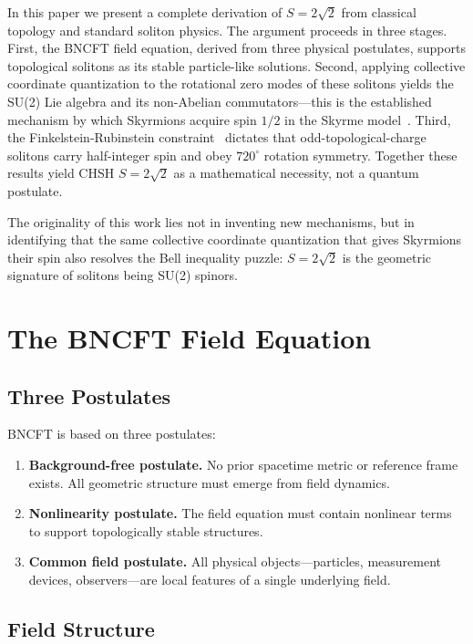 ﻿\documentclass[11pt,a4paper]{article}
\begin{document}
In this paper we present a complete derivation of $S = 2\sqrt{2}$ from classical topology and standard soliton physics. The argument proceeds in three stages. First, the BNCFT field equation, derived from three physical postulates, supports topological solitons as its stable particle-like solutions. Second, applying collective coordinate quantization to the rotational zero modes of these solitons yields the SU(2) Lie algebra and its non-Abelian commutators---this is the established mechanism by which Skyrmions acquire spin $1/2$ in the Skyrme model~\cite{skyrme1962,anw1983}. Third, the Finkelstein-Rubinstein constraint~\cite{fr1968} dictates that odd-topological-charge solitons carry half-integer spin and obey $720^\circ$ rotation symmetry. Together these results yield CHSH $S = 2\sqrt{2}$ as a mathematical necessity, not a quantum postulate.

The originality of this work lies not in inventing new mechanisms, but in identifying that the same collective coordinate quantization that gives Skyrmions their spin also resolves the Bell inequality puzzle: $S = 2\sqrt{2}$ is the geometric signature of solitons being SU(2) spinors.

\section{The BNCFT Field Equation}

\subsection{Three Postulates}

BNCFT is based on three postulates:

\begin{enumerate}
\item \textbf{Background-free postulate.} No prior spacetime metric or reference frame exists. All geometric structure must emerge from field dynamics.
\item \textbf{Nonlinearity postulate.} The field equation must contain nonlinear terms to support topologically stable structures.
\item \textbf{Common field postulate.} All physical objects---particles, measurement devices, observers---are local features of a single underlying field.
\end{enumerate}

\subsection{Field Structure}
\end{document}
